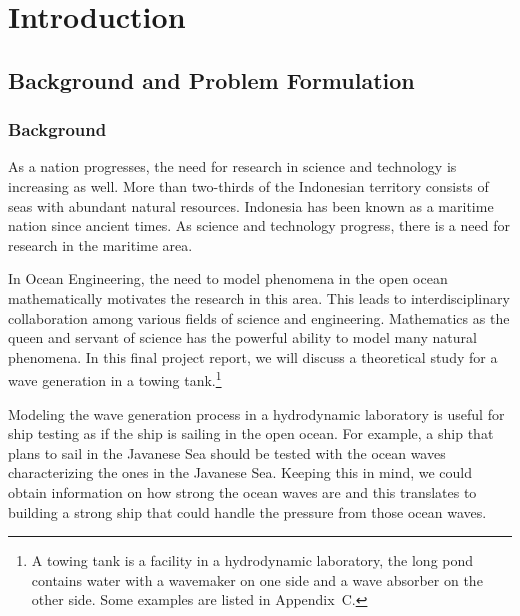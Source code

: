 \documentclass[12pt,a4paper]{report}
\begin{document}
\newpage
\pagestyle{headings} \setcounter{page}{9}
 \tableofcontents

\newpage
{} \listoffigures

\chapter{Introduction}


\section{Background and Problem Formulation}

\subsection{Background}

As a nation progresses, the need for research in science and technology is increasing as well. More than two-thirds of the Indonesian territory consists of seas with abundant natural resources. Indonesia has been known as a maritime nation since ancient times. As science and technology progress, there is a need for research in the maritime area. 

In Ocean Engineering, the need to model phenomena in the open ocean mathematically motivates the research in this area. This leads to interdisciplinary collaboration among various fields of science and engineering. Mathematics as the queen and servant of science has the powerful ability to model many natural phenomena. In this final project report, we will discuss a theoretical study for a wave generation in a towing tank.\footnote[1]{A towing tank is a facility in a hydrodynamic laboratory, the long pond contains water with a wavemaker on one side and a wave absorber on the other side. Some examples are listed in Appendix~C.}

Modeling the wave generation process in a hydrodynamic laboratory is useful for ship testing as if the ship is sailing in the open ocean.
For example, a ship that plans to sail in the Javanese Sea should be tested with the ocean waves characterizing the ones in the Javanese Sea.
Keeping this in mind, we could obtain information on how strong the ocean waves are and this translates to building a strong ship that could handle the pressure from those ocean waves.
\end{document}
